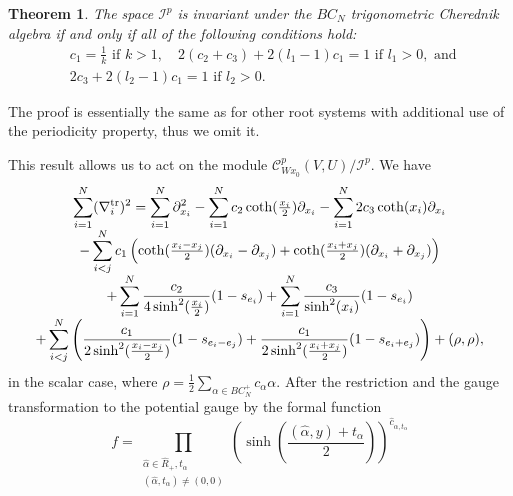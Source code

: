 \documentclass[12pt]{amsart}
\numberwithin{equation}{section}
\newtheorem{theorem}{Theorem}[section]
\theoremstyle{definition}
\begin{document}
\begin{theorem} 
    The space $\mathcal{I}^p$ is invariant under the $BC_N$ trigonometric Cherednik algebra if and only if all of the following conditions hold:
    \begin{align}
    \label{cond}
        &c_1 = \frac1k \text{ if } k>1, \quad 2(c_2+c_3) + 2(l_1-1)c_1 = 1 \text{ if } l_1>0, \text{ and } \\
        & \nonumber 2c_3 + 2(l_2-1)c_1 = 1 \text{ if } l_2>0.
    \end{align}
\end{theorem}
    The proof is essentially the same as for other root systems with additional use of the periodicity property, thus we omit it.

This result allows us to act on the module $ \mathcal{C}^p_{Wx_0}(V, U) / \mathcal{I}^p$. 
We have
\begin{equation*}
\begin{array}{c}
\displaystyle{
    \sum\limits_{i = 1}^N (\nabla^{\rm tr}_i)^2 = \sum\limits_{i = 1}^N \partial_{x_i}^2 - \sum\limits_{i = 1}^N c_2 \coth(\tfrac{x_i}{2}) \partial_{x_i} - \sum\limits_{i = 1}^N 2 c_3 \coth(x_i) \partial_{x_i} 
    }
    \\ 
\displaystyle{
    - \sum\limits_{i < j}^N c_1 \left( \coth(\tfrac{x_i - x_j}{2}) (\partial_{x_i} - \partial_{x_j}) + \coth(\tfrac{x_i + x_j}{2}) (\partial_{x_i} + \partial_{x_j}) \right)
    }
    \\  
\displaystyle{
    + \sum\limits_{i = 1}^N \frac{c_2}{4 \sinh^2(\frac{x_i}{2})} (1 - s_{e_i}) + \sum\limits_{i = 1}^N \frac{c_3}{\sinh^2(x_i)} (1 - s_{e_i}) 
    }
    \\ 
\displaystyle{
    + \sum\limits_{i < j}^N \left( \frac{c_1}{2 \sinh^2(\frac{x_i - x_j}{2})} (1 - s_{e_i - e_j}) + \frac{c_1}{2 \sinh^2(\frac{x_i + x_j}{2})} (1 - s_{e_i + e_j}) \right) + (\rho, \rho ),
    }
    \end{array}
\end{equation*}
in the scalar case, where $\rho = \frac12\sum_{\alpha \in BC_N^+} c_\alpha \alpha$.
After the restriction and the gauge transformation to the potential gauge by the formal function
\begin{equation*}
    f = \prod_{\substack{\widehat\alpha \in \widehat{R}_+, t_{\alpha} \\ (\widehat{\alpha}, t_{\alpha}) \neq (0,0)}}\left( \sinh\left(\frac{(\widehat{\alpha}, y) + t_{\alpha}}{2}\right)\right)^{\widehat{c}_{\widehat{\alpha}, t_{\alpha}}} 
\end{equation*}
\end{document}

